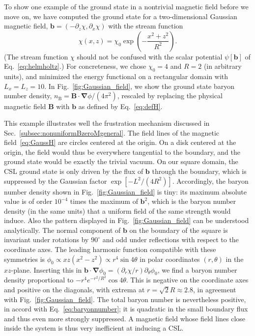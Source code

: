\documentclass[pdflatex,iicol,sn-mathphys-num]{sn-jnl}
\let\p=\phi
\let\de=\partial
\newcommand{\vek}[1]{\bm{#1}}%
\newcommand{\grad}{\vek\nabla}%
\newcommand{\bmag}{b}%
\begin{document}
To show one example of the ground state in a nontrivial magnetic field before we move on, we have computed the ground state for a two-dimensional Gaussian magnetic field, $\vek\bmag=(-\de_z\chi,\de_x\chi)$ with the stream function
\begin{equation}
\chi(x,z)=\chi_0\exp\left(-\frac{x^2+z^2}{R^2}\right).
\label{eq:GaussH}
\end{equation}
(The stream function $\chi$ should not be confused with the scalar potential $\psi[\vek\bmag]$ of Eq.~\eqref{eq:helmholtz}.) For concreteness, we chose $\chi_0=4$ and $R=2$ (in arbitrary units), and minimized the energy functional on a rectangular domain with $L_x=L_z=10$. In Fig.~\ref{fig:Gaussian_field}, we show the ground state baryon number density, $n_\text{B}=\vek B\cdot\grad\p/(4\pi^2)$, rescaled by replacing the physical magnetic field $\vek B$ with $\vek\bmag$ as defined by Eq.~\eqref{eq:defH}.

This example illustrates well the frustration mechanism discussed in Sec.~\ref{subsec:nonuniformBzeroMgeneral}. The field lines of the magnetic field~\eqref{eq:GaussH} are circles centered at the origin. On a disk centered at the origin, the field would thus be everywhere tangential to the boundary, and the ground state would be exactly the trivial vacuum. On our square domain, the CSL ground state is only driven by the flux of $\vek\bmag$ through the boundary, which is suppressed by the Gaussian factor $\exp[-L^2/(4R^2)]$. Accordingly, the baryon number density shown in Fig.~\ref{fig:Gaussian_field} is tiny: its maximum absolute value is of order $10^{-4}$ times the maximum of $\vek\bmag^2$, which is the baryon number density (in the same units) that a uniform field of the same strength would induce. Also the pattern displayed in Fig.~\ref{fig:Gaussian_field} can be understood analytically. The normal component of $\vek\bmag$ on the boundary of the square is invariant under rotations by $90^\circ$ and odd under reflections with respect to the coordinate axes. The leading harmonic function compatible with these symmetries is $\p_0\propto xz(x^2-z^2)\propto r^4\sin4\theta$ in polar coordinates $(r,\theta)$ in the $xz$-plane. Inserting this in $\vek\bmag\cdot\grad\p_0=(\de_r\chi/r)\de_\theta\p_0$, we find a baryon number density proportional to $-r^4e^{-r^2/R^2}\cos4\theta$. This is negative on the coordinate axes and positive on the diagonals, with extrema at $r=\sqrt2R\approx2.8$, in agreement with Fig.~\ref{fig:Gaussian_field}. The total baryon number is nevertheless positive, in accord with Eq.~\eqref{eq:baryonnumber}; it is quadratic in the small boundary flux and thus even more strongly suppressed. A magnetic field whose field lines close inside the system is thus very inefficient at inducing a CSL.
\end{document}
